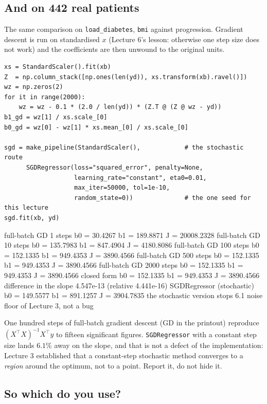 \documentclass[11pt]{article}
\begin{document}
\subsection{And on 442 real patients}

The same comparison on \texttt{load\_diabetes}, \texttt{bmi} against
progression. Gradient descent is run on standardised $x$ (Lecture 6's lesson:
otherwise one step size does not work) and the coefficients are then unwound
to the original units.

\begin{lstlisting}
xs = StandardScaler().fit(xb)
Z  = np.column_stack([np.ones(len(yd)), xs.transform(xb).ravel()])
wz = np.zeros(2)
for it in range(2000):
    wz = wz - 0.1 * (2.0 / len(yd)) * (Z.T @ (Z @ wz - yd))
b1_gd = wz[1] / xs.scale_[0]
b0_gd = wz[0] - wz[1] * xs.mean_[0] / xs.scale_[0]

sgd = make_pipeline(StandardScaler(),            # the stochastic route
      SGDRegressor(loss="squared_error", penalty=None,
                   learning_rate="constant", eta0=0.01,
                   max_iter=50000, tol=1e-10,
                   random_state=0))              # the one seed for this lecture
sgd.fit(xb, yd)
\end{lstlisting}
\begin{codeout}
full-batch GD     1 steps   b0 =   30.4267   b1 =  189.8871   J = 20008.2328
full-batch GD    10 steps   b0 =  135.7983   b1 =  847.4904   J = 4180.8086
full-batch GD   100 steps   b0 =  152.1335   b1 =  949.4353   J = 3890.4566
full-batch GD   500 steps   b0 =  152.1335   b1 =  949.4353   J = 3890.4566
full-batch GD  2000 steps   b0 =  152.1335   b1 =  949.4353   J = 3890.4566
closed form               b0 =  152.1335   b1 =  949.4353   J = 3890.4566
difference in the slope   4.547e-13 (relative 4.441e-16)
SGDRegressor (stochastic) b0 =  149.5577   b1 =  891.1257   J = 3904.7835
the stochastic version stops 6.1%
noise floor of Lecture 3, not a bug
\end{codeout}

One hundred steps of full-batch gradient descent (GD in the printout) reproduce
$(X^{\!\top}\!X)^{-1}X^{\!\top}y$ to fifteen significant figures.
\texttt{SGDRegressor} with a constant step size lands $6.1\%$ away on the
slope, and that is not a defect of the implementation: Lecture 3 established
that a constant-step stochastic method converges to a \emph{region} around the
optimum, not to a point. Report it, do not hide it.

\subsection{So which do you use?}
\end{document}
